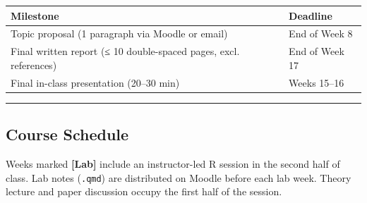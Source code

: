 \documentclass[
  12pt,
  letterpaper,
  DIV=11,
  numbers=noendperiod]{scrartcl}
\newcounter{none} %
\begin{document}
{\def\LTcaptype{none} %
\begin{longtable}[]{@{}
  >{\raggedright\arraybackslash}p{}
  >{\raggedright\arraybackslash}p{}@{}}
\toprule\noalign{}
\begin{minipage}[b]{\linewidth}\raggedright
Milestone
\end{minipage} & \begin{minipage}[b]{\linewidth}\raggedright
Deadline
\end{minipage} \\
\midrule\noalign{}
\endhead
\bottomrule\noalign{}
\endlastfoot
Topic proposal (1 paragraph via Moodle or email) & End of Week 8 \\
Final written report (≤ 10 double-spaced pages, excl. references) & End
of Week 17 \\
Final in-class presentation (20--30 min) & Weeks 15--16 \\
\end{longtable}
}

\begin{center}\rule{0.5\linewidth}{0.5pt}\end{center}

\subsection{Course Schedule}\label{course-schedule}

Weeks marked \textbf{{[}Lab{]}} include an instructor-led R session in
the second half of class. Lab notes (\texttt{.qmd}) are distributed on
Moodle before each lab week. Theory lecture and paper discussion occupy
the first half of the session.
\end{document}
